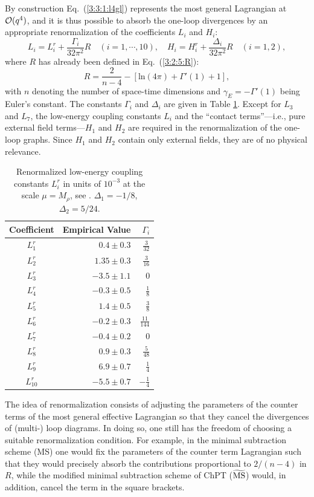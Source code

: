 \documentclass[twoside,12pt]{article}
\begin{document}
   By construction Eq.\ (\ref{3:3:1:l4gl}) represents the most general
Lagrangian at ${\cal O}(q^4)$, and it is thus possible to absorb the one-loop
divergences by an appropriate renormalization of the coefficients
$L_i$ and $H_i$:
\begin{equation}
\label{3:3:1:lihi}
L_i=L_i^r+\frac{\Gamma_i}{32\pi^2}R \quad (i=1,\cdots,10),\quad
H_i=H^r_i+\frac{\Delta_i}{32\pi^2}R\quad (i=1,2),
\end{equation}
   where $R$ has already been defined in Eq.~(\ref{3:2:5:R}):
\begin{displaymath}
R=\frac{2}{n-4}
-[\mbox{ln}(4\pi)+\Gamma'(1)+1],
\end{displaymath}
   with $n$ denoting the number of space-time dimensions and
$\gamma_E=-\Gamma'(1)$ being Euler's constant.
   The constants $\Gamma_i$ and $\Delta_i$ are given in Table
\ref{4:8:tableli}.
   Except for $L_3$ and $L_7$, the low-energy coupling constants $L_i$ and the
``contact terms''---i.e., pure external field terms---$H_1$ and $H_2$
are required in the renormalization of the one-loop graphs.
   Since $H_1$ and $H_2$ contain only external fields, they are of no
physical relevance.
\begin{table}[t]
\begin{center}
\begin{tabular}{|c|r|r|}
\hline
Coefficient &Empirical Value &$\Gamma_i$\\
\hline
$L_1^r$ &    $ 0.4\pm 0.3$  &$\frac{3}{32}$\\
$L_2^r$ &    $ 1.35\pm 0.3$ &$\frac{3}{16}$\\
$L_3^r$ &    $-3.5\pm 1.1$  &$0$\\
$L_4^r$ &    $-0.3\pm 0.5$  &$\frac{1}{8}$\\
$L_5^r$ &    $ 1.4\pm 0.5$  &$\frac{3}{8}$\\
$L_6^r$ &    $-0.2\pm 0.3$  &$\frac{11}{144}$\\
$L_7^r$ &    $-0.4\pm 0.2$  &$0$\\
$L_8^r$ &    $ 0.9\pm 0.3$  &$\frac{5}{48}$\\
$L_9^r$ &    $ 6.9\pm 0.7$  &$\frac{1}{4}$\\
$L_{10}^r$ & $-5.5\pm 0.7$  &$-\frac{1}{4}$\\
\hline
\end{tabular}
\end{center}
\caption[test]{\label{4:8:tableli} Renormalized low-energy
coupling constants $L_i^r$ in units of $10^{-3}$ at the scale
$\mu=M_\rho$, see \cite{Bijnens:1994qh:9}.
$\Delta_1=-1/8$, $\Delta_2=5/24$. }
\end{table}
   The idea of renormalization consists of adjusting the parameters of the
counter terms of the most general effective Lagrangian
so that they cancel the divergences of (multi-) loop diagrams.
   In doing so, one still has the freedom of choosing a suitable
renormalization condition.
   For example, in the minimal subtraction scheme (MS) one would fix the
parameters of the counter term Lagrangian such that they would precisely absorb
the contributions proportional to $2/(n-4)$ in $R$,
while the modified minimal subtraction scheme of ChPT ($\widetilde{\rm MS}$) would,
in addition, cancel the term in the square brackets.
\end{document}
